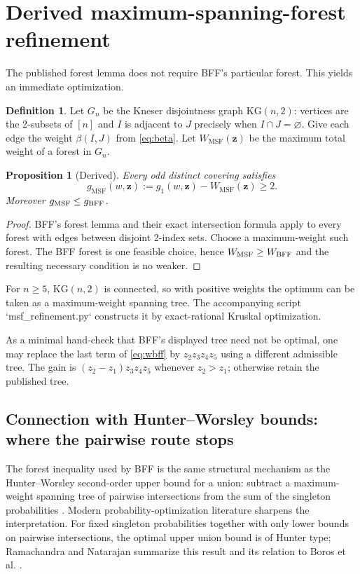 \documentclass[11pt]{article}
\newtheorem{proposition}[theorem]{Proposition}
\theoremstyle{definition}
\newtheorem{definition}[theorem]{Definition}
\newcommand{\kg}{\mathrm{KG}}
\newcommand{\MSF}{\mathrm{MSF}}
\begin{document}
\section{Derived maximum-spanning-forest refinement}

The published forest lemma does not require BFF's particular forest.  This yields an immediate
optimization.

\begin{definition}
Let $G_n$ be the Kneser disjointness graph $\kg(n,2)$: vertices are the 2-subsets of $[n]$ and
$I$ is adjacent to $J$ precisely when $I\cap J=\varnothing$.  Give each edge the weight
$\beta(I,J)$ from \eqref{eq:beta}.  Let $W_{\MSF}(\mathbf z)$ be the maximum total weight of a
forest in $G_n$.
\end{definition}

\begin{proposition}[Derived]
Every odd distinct covering satisfies
\begin{equation}\label{eq:gmsf}
 g_{\MSF}(w,\mathbf z)
 :=g_1(w,\mathbf z)-W_{\MSF}(\mathbf z)\ge2.
\end{equation}
Moreover $g_{\MSF}\le g_{\rm BFF}$.
\end{proposition}

\begin{proof}
BFF's forest lemma and their exact intersection formula apply to every forest with edges between
disjoint 2-index sets.  Choose a maximum-weight such forest.  The BFF forest is one feasible
choice, hence $W_{\MSF}\ge W_{\rm BFF}$ and the resulting necessary condition is no weaker.
\end{proof}

For $n\ge5$, $\kg(n,2)$ is connected, so with positive weights the optimum can be taken as a
maximum-weight spanning tree.  The accompanying script `msf\_refinement.py` constructs it by
exact-rational Kruskal optimization.

As a minimal hand-check that BFF's displayed tree need not be optimal, one may replace the last
term of \eqref{eq:wbff} by $z_2z_3z_4z_5$ using a different admissible tree.  The gain is
$(z_2-z_1)z_3z_4z_5$ whenever $z_2>z_1$; otherwise retain the published tree.

\subsection{Connection with Hunter--Worsley bounds: where the pairwise route stops}

The forest inequality used by BFF is the same structural mechanism as the Hunter--Worsley
second-order upper bound for a union: subtract a maximum-weight spanning tree of pairwise
intersections from the sum of the singleton probabilities \cite{Hunter1976,Worsley1982}.
Modern probability-optimization literature sharpens the interpretation.  For fixed singleton
probabilities together with only lower bounds on pairwise intersections, the optimal upper union
bound is of Hunter type; Ramachandra and Natarajan summarize this result and its relation to
Boros et al. \cite{BorosEtAl2014,RamachandraNatarajan2023}.
\end{document}
